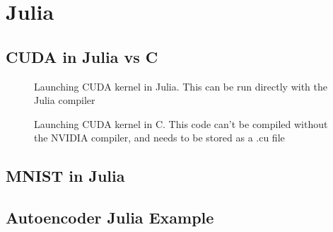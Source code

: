 \chapter{Julia}
\label{app:julia}

\section{CUDA in Julia vs C}
\label{app:jlscicomp}

\begin{figure}[!h]
    \centering
    
    \caption{Launching CUDA kernel in Julia. This can be run directly with the Julia compiler}
    \label{fig:jlcuda}
\end{figure}
 
\begin{figure}[!h]
    \centering
    
    \caption{Launching CUDA kernel in C. This code can't be compiled without the NVIDIA compiler, and needs to be stored as a .cu file}
    \label{fig:ccuda}
\end{figure}

\section{MNIST in Julia}



\section{Autoencoder Julia Example}

